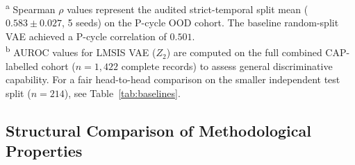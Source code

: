 \documentclass[12pt,a4paper,oneside]{report}
\begin{document}
\begin{table}[H]
\centering
\caption{Steatosis prediction performance in normal-BMI cohort.}
\label{tab:perf_comparison}
\par\smallskip\raggedright\footnotesize
\textsuperscript{a} Spearman $\rho$ values represent the audited strict-temporal split mean ($0.583 \pm 0.027$, 5 seeds) on the P-cycle OOD cohort. The baseline random-split VAE achieved a P-cycle correlation of $0.501$. \\
\textsuperscript{b} AUROC values for LMSIS VAE ($Z_2$) are computed on the full combined CAP-labelled cohort ($n=1{,}422$ complete records) to assess general discriminative capability. For a fair head-to-head comparison on the smaller independent test split ($n=214$), see Table~\ref{tab:baselines}.
\end{table}

\subsection{Structural Comparison of Methodological Properties}
\end{document}
